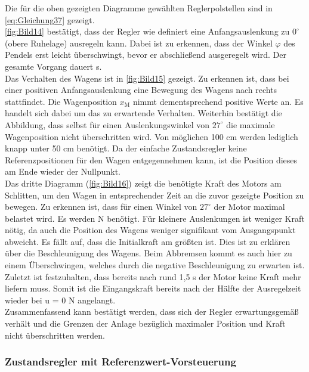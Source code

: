 Die für die oben gezeigten Diagramme gewählten Reglerpolstellen sind in \autoref{eq:Gleichung37} gezeigt. \\
\newline
\autoref{fig:Bild14} bestätigt, dass der Regler wie definiert eine Anfangsauslenkung zu $0^\circ$ (obere Ruhelage) ausregeln kann. Dabei ist zu erkennen, dass der Winkel $\varphi$ des Pendels erst leicht überschwingt, bevor er abschließend ausgeregelt wird. Der gesamte Vorgang dauert  s. \\
\newline
Das Verhalten des Wagens ist in \autoref{fig:Bild15} gezeigt. Zu erkennen ist, dass bei einer positiven Anfangsauslenkung eine Bewegung des Wagens nach rechts stattfindet. Die Wagenposition $x_{\mathrm{M}}$ nimmt dementsprechend positive Werte an. Es handelt sich dabei um das zu erwartende Verhalten. Weiterhin bestätigt die Abbildung, dass selbst für einen Auslenkungswinkel von $27^\circ$ die maximale Wagenposition nicht überschritten wird. Von möglichen 100 cm werden lediglich knapp unter 50 cm benötigt. Da der einfache Zustandsregler keine Referenzpositionen für den Wagen entgegennehmen kann, ist die Position dieses am Ende wieder der Nullpunkt. \\
\newline
Das dritte Diagramm (\autoref{fig:Bild16}) zeigt die benötigte Kraft des Motors am Schlitten, um den Wagen in entsprechender Zeit an die zuvor gezeigte Position zu bewegen. Zu erkennen ist, dass für einen Winkel von $27^\circ$ der Motor maximal belastet wird. Es werden  N benötigt. Für kleinere Auslenkungen ist weniger Kraft nötig, da auch die Position des Wagens weniger signifikant vom Ausgangspunkt abweicht. Es fällt auf, dass die Initialkraft am größten ist. Dies ist zu erklären über die Beschleunigung des Wagens. Beim Abbremsen kommt es auch hier zu einem Überschwingen, welches durch die negative Beschleunigung zu erwarten ist. Zuletzt ist festzuhalten, dass bereits nach rund 1,5 s der Motor keine Kraft mehr liefern muss. Somit ist die Eingangskraft bereits nach \ca der Hälfte der Ausregelzeit wieder bei u = 0 N  angelangt.\\
\newline
Zusammenfassend kann bestätigt werden, dass sich der Regler erwartungsgemäß verhält und die Grenzen der Anlage bezüglich maximaler Position und Kraft nicht überschritten werden.

\subsubsection{Zustandsregler mit Referenzwert-Vorsteuerung} \label{sec:val-vor}

